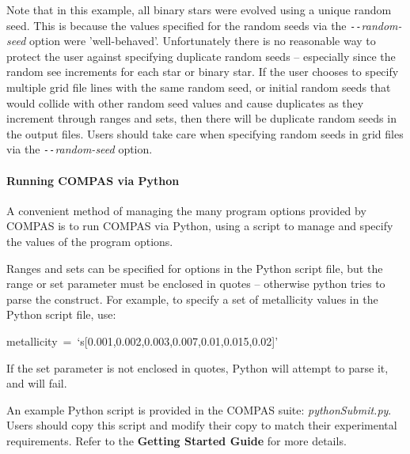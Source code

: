 Note that in this example, all binary stars were evolved using a unique random seed. This is because the values specified for the random seeds via the \textit{\texttt{-{}-}random-seed} option were 'well-behaved'. Unfortunately there is no reasonable way to protect the user against specifying duplicate random seeds – especially since the random see increments for each star or binary star. If the user chooses to specify multiple grid file lines with the same random seed, or initial random seeds that would collide with other random seed values and cause duplicates as they increment through ranges and sets, then there will be duplicate random seeds in the output files. Users should take care when specifying random seeds in grid files via the \textit{\texttt{-{}-}random-seed} option.

\paragraph{Running COMPAS via Python}\label{sec:PythonSubmit}\mbox{}

A convenient method of managing the many program options provided by COMPAS is to run COMPAS via Python, using a script to manage and specify the values of the program options.

Ranges and sets can be specified for options in the Python script file, but the range or set parameter must be enclosed in quotes – otherwise python tries to parse the construct. For example, to specify a set of metallicity values in the Python script file, use:

\bigskip
\tabto{3em}metallicity~=~‘s[0.001,0.002,0.003,0.007,0.01,0.015,0.02]’

\bigskip
If the set parameter is not enclosed in quotes, Python will attempt to parse it, and will fail.

\bigskip
An example Python script is provided in the COMPAS suite: \textit{pythonSubmit.py}. Users should copy this script and modify their copy to match their experimental requirements. Refer to the \textbf{Getting Started Guide} for more details.



